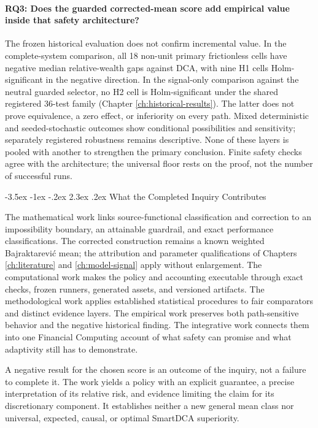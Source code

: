 \documentclass[12pt,a4paper,oneside]{report}
\makeatletter
\renewcommand\section{\@startsection{section}{1}{\z@}%
  {-3.5ex \@plus -1ex \@minus -.2ex}%
  {2.3ex \@plus .2ex}%
  {\normalfont\fontsize{14}{17}\selectfont\bfseries}}
\makeatother
\begin{document}
\paragraph{RQ3: Does the guarded corrected-mean score add empirical value
inside that safety architecture?}
The frozen historical evaluation does not confirm incremental value. In the
complete-system comparison, all 18 non-unit primary frictionless cells have
negative median relative-wealth gaps against DCA, with nine H1 cells
Holm-significant in the negative direction. In the signal-only comparison
against the neutral guarded selector, no H2 cell is Holm-significant under
the shared registered 36-test family (Chapter \ref{ch:historical-results}).
The latter does not prove equivalence, a zero effect, or inferiority on every
path. Mixed deterministic and seeded-stochastic outcomes show conditional
possibilities and sensitivity; separately registered robustness remains
descriptive. None of these layers is pooled with another to strengthen the
primary conclusion. Finite safety checks agree with the architecture; the
universal floor rests on the proof, not the number of successful runs.

\section{What the Completed Inquiry Contributes}
\label{sec:conclusion-contributions}

The mathematical work links source-functional classification and correction
to an impossibility boundary, an attainable guardrail, and exact performance
classifications. The corrected construction remains a known weighted
Bajraktarevi\'c mean; the attribution and parameter qualifications of Chapters
\ref{ch:literature} and \ref{ch:model-signal} apply without enlargement.
The computational work makes the policy and accounting executable through
exact checks, frozen runners, generated assets, and versioned artifacts.
The methodological work applies established statistical procedures to fair
comparators and distinct evidence layers. The empirical work preserves both
path-sensitive behavior and the negative historical finding. The integrative
work connects them into one Financial Computing account of what safety can
promise and what adaptivity still has to demonstrate.

A negative result for the chosen score is an outcome of the inquiry, not a
failure to complete it. The work yields a policy with an explicit guarantee,
a precise interpretation of its relative risk, and evidence limiting the
claim for its discretionary component. It establishes neither a new general
mean class nor universal, expected, causal, or optimal SmartDCA superiority.
\end{document}
